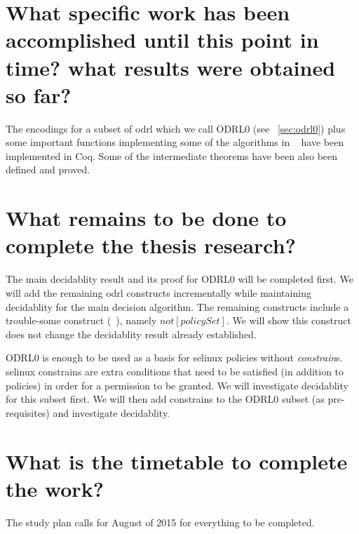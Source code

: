 \section{What specific work has been accomplished until this point in time? what results were obtained so far?}

The encodings for a subset of \ac{odrl} which we call ODRL0 (see ~\ref{sec:odrl0}) plus some important functions implementing some of the algorithms in ~\cite{pucella2006} have been implemented in Coq. Some of the intermediate theorems have been also been defined and proved.

\section{What remains to be done to complete the thesis research?}
The main decidablity result and its proof for ODRL0 will be completed first. We will add the remaining \ac{odrl} constructs incrementally while maintaining decidablity for the main decision algorithm. The remaining constructs include a trouble-some construct (~\cite{pucella2006}), namely $not[policySet]$. We will show this construct does not change the decidablity result already established. 

ODRL0 is enough to be used as a basis for \ac{selinux} policies without \emph{constrain}s. \ac{selinux} constrains are extra  conditions that need to be satisfied (in addition to policies) in order for a permission to be granted. We will investigate decidablity for this subset first. We will then add constrains to the ODRL0 subset (as pre-requisites) and investigate decidablity.



\section{What is the timetable to complete the work?}

The study plan calls for August of 2015 for everything to be completed.










